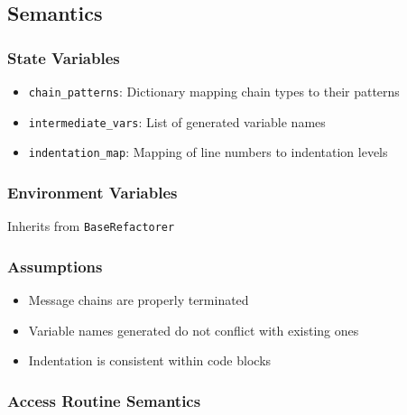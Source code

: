 \documentclass[12pt, titlepage]{article}
\begin{document}
\subsection{Semantics}

\subsubsection{State Variables}

\begin{itemize}
  \item \texttt{chain\_patterns}: Dictionary mapping chain types to their patterns
  \item \texttt{intermediate\_vars}: List of generated variable names
  \item \texttt{indentation\_map}: Mapping of line numbers to indentation levels
\end{itemize}

\subsubsection{Environment Variables}
Inherits from \texttt{BaseRefactorer}

\subsubsection{Assumptions}
\begin{itemize}
  \item Message chains are properly terminated
  \item Variable names generated do not conflict with existing ones
  \item Indentation is consistent within code blocks
\end{itemize}

\subsubsection{Access Routine Semantics}
\end{document}
